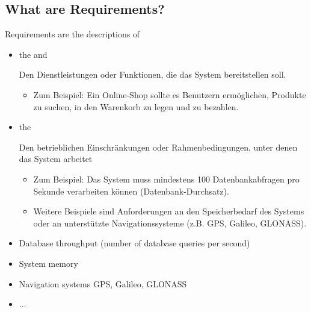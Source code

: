 \subsection{What are Requirements?}
\begin{defBox}[title=Definition(Requirements)]
	Requirements are the descriptions of 
	\begin{itemize}
		\item the  and
        \begin{infoBox}
            Den Dienstleistungen oder Funktionen, die das System bereitstellen soll.
            \begin{itemize}
                \item Zum Beispiel: Ein Online-Shop sollte es Benutzern ermöglichen, Produkte zu suchen, in den Warenkorb zu legen und zu bezahlen.
            \end{itemize}
        \end{infoBox}
		\item the 
        \begin{infoBox}
            Den betrieblichen Einschränkungen oder Rahmenbedingungen, unter denen das System arbeitet
            \begin{itemize}
                \item Zum Beispiel: Das System muss mindestens 100 Datenbankabfragen pro Sekunde verarbeiten können (Datenbank-Durchsatz).
                \item Weitere Beispiele sind Anforderungen an den Speicherbedarf des Systems oder an unterstützte Navigationssysteme (z.B. GPS, Galileo, GLONASS).
            \end{itemize}
        \end{infoBox}
	\end{itemize}
\end{defBox}
\begin{defBox}
	\begin{itemize}
		\item Database throughput (number of database queries per second)
		\item System memory
		\item Navigation systems GPS, Galileo, GLONASS
		\item ...
	\end{itemize}
\end{defBox}


